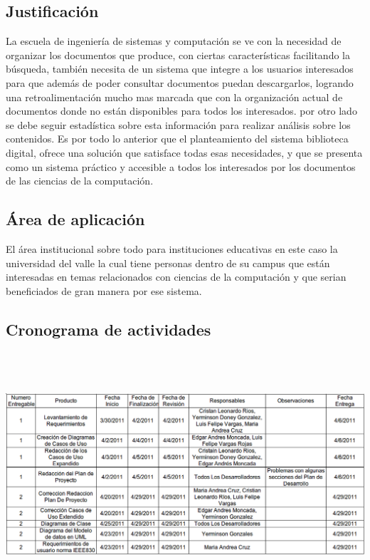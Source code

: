 \documentclass[11pt]{article}
\begin{document}
        \subsection{Justificación}
        La escuela de ingeniería de sistemas y computación se ve con la necesidad de organizar los
        documentos que produce, con ciertas características facilitando la búsqueda, también
        necesita de un sistema que integre a los usuarios interesados para que además de poder
        consultar documentos puedan descargarlos, logrando una retroalimentación mucho mas marcada
        que con la organización actual de documentos donde no están disponibles para todos los
        interesados. por otro lado se debe seguir estadística sobre esta información para realizar
        análisis sobre los contenidos.
        Es por todo lo anterior que el planteamiento del sistema biblioteca digital, ofrece una
        solución que satisface todas esas necesidades, y que se presenta como un sistema práctico y
        accesible a todos los interesados por los documentos de las ciencias de la computación.
        
        \subsection{Área de aplicación}
        El área institucional sobre todo para instituciones educativas en este caso la universidad
        del valle la cual tiene personas dentro de su campus que están interesadas en temas 
        relacionados con ciencias de la computación y que serian beneficiados de gran manera por
        ese sistema.
        
        \subsection{Cronograma de actividades}
        \begin{minipage}[c]{1\linewidth}
                \centering
                \includegraphics[width=16cm, height=9cm]{Cronograma2}
        \end{minipage}
        
\end{document}
